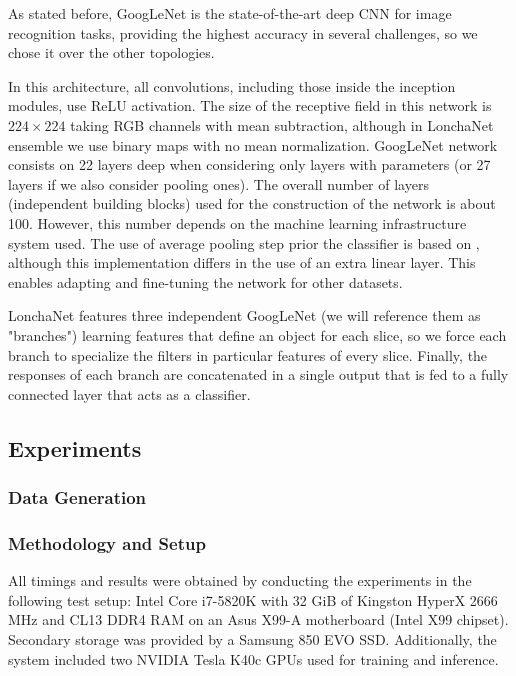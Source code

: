 As stated before, GoogLeNet is the state-of-the-art deep \acl{CNN} for image recognition tasks, providing the highest accuracy in several challenges, so we chose it over the other topologies.

In this architecture, all convolutions, including those inside the inception modules, use \ac{ReLU} activation.
The size of the receptive field in this network is $224 \times 224$ taking RGB  channels with mean subtraction, although in  LonchaNet ensemble we use binary maps with no mean normalization.
GoogLeNet network consists on 22 layers deep when considering only layers with
parameters (or 27 layers if we also consider pooling ones). The overall number of layers (independent building blocks) used for the construction of the network is about 100. However, this number depends on the machine learning infrastructure system used. The use of average pooling step prior the classifier is
based on \cite{Lin2013}, although this implementation differs in the  use of an extra linear layer. This enables adapting and fine-tuning the network for other datasets.

LonchaNet features three independent GoogLeNet (we will reference them as "branches") learning features that define an object for each slice, so we force each branch to specialize the filters in  particular features of every slice. Finally, the responses of each branch are concatenated in a single output that is fed to a fully connected layer that acts as a classifier.

\subsection{Experiments}
\label{cha:objrecog:sec:lonchanet:subsec:experiments}

\subsubsection{Data Generation}
\label{cha:objrecog:sec:lonchanet:subsec:experiments:subsubsec:data}

\subsubsection{Methodology and Setup}
\label{cha:objrecog:sec:lonchanet:subsec:experiments:subsubsec:methodology}

All timings and results were obtained by conducting the experiments in the following test setup: Intel Core i7-5820K with 32 GiB of Kingston HyperX 2666 MHz and CL13 DDR4 RAM on an Asus X99-A motherboard (Intel X99 chipset). Secondary storage was provided by a Samsung 850 EVO SSD. Additionally, the system included two NVIDIA Tesla K40c \acp{GPU} used for training and inference.

